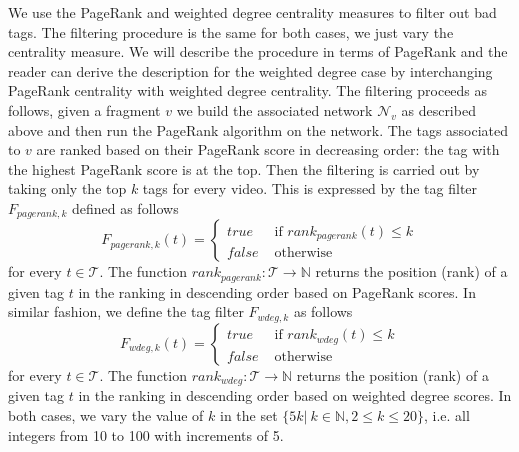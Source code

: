 We use the PageRank and weighted degree centrality measures to filter out bad tags. The filtering procedure is the same for both cases, we just vary the centrality measure. We will describe the procedure in terms of PageRank and the reader can derive the description for the weighted degree case by interchanging PageRank centrality with weighted degree centrality. The filtering proceeds as follows, given a fragment $v$ we build the associated network $\mathcal{N}_v$ as described above and then run the PageRank algorithm on the network. The tags associated to $v$ are ranked based on their PageRank score in decreasing order: the tag with the highest PageRank score is at the top. Then the filtering is carried out by taking only the top $k$ tags for every video. This is expressed by the tag filter $F_{pagerank,k}$ defined as follows
\begin{equation}
F_{pagerank,k}(t) = \left\{ 
	\begin{array}{rl}
	true &\mbox{ if $rank_{pagerank}(t) \leq k$} \\
	false &\mbox{ otherwise}
	\end{array}
\right.
\end{equation}
for every $t \in \mathcal{T}$. The function $rank_{pagerank}: \mathcal{T} \rightarrow \mathbb{N}$ returns the  position (rank) of a given tag $t$ in the ranking in descending order based on PageRank scores. In similar fashion, we define the tag filter $F_{wdeg,k}$ as follows
\begin{equation}
F_{wdeg,k}(t) = \left\{ 
	\begin{array}{rl}
	true &\mbox{ if $rank_{wdeg}(t) \leq k$} \\
	false &\mbox{ otherwise}
	\end{array}
\right.
\end{equation}
for every $t \in \mathcal{T}$. The function $rank_{wdeg}: \mathcal{T} \rightarrow \mathbb{N}$ returns the  position (rank) of a given tag $t$ in the ranking in descending order based on weighted degree scores.
In both cases, we vary the value of $k$ in the set $\{5k|~k\in \mathbb{N}, 2 \leq k \leq 20\}$, i.e. all integers from 10 to 100 with increments of 5.

